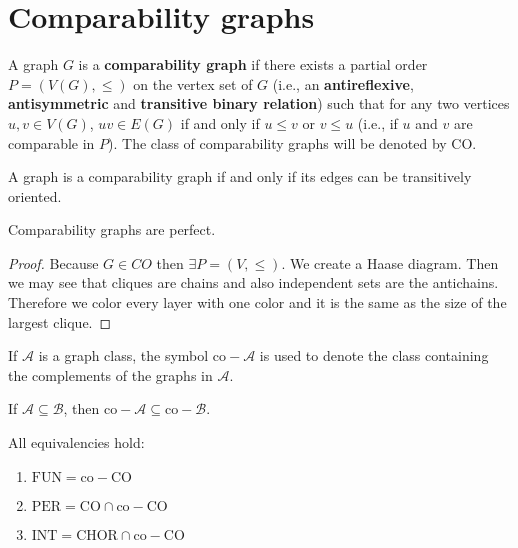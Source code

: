 \section{Comparability graphs}

\begin{defn}
	A graph $G$ is a \textbf{comparability graph} if there exists a partial order $P = (V(G), \leq)$ on the vertex set of $G$ (i.e., an \textbf{antireflexive}, \textbf{antisymmetric} and \textbf{transitive binary relation}) such that for any two vertices $u, v \in V(G)$, $uv \in E(G)$ if and only if $u \leq v$ or $v \leq u$ (i.e., if $u$ and $v$ are comparable in $P$). The class of comparability graphs will be denoted by CO.
\end{defn}

\begin{observ}
	A graph is a comparability graph if and only if its edges can be transitively oriented.
\end{observ}

\begin{thm}
	Comparability graphs are perfect.
\end{thm}

\begin{proof}
	Because $G \in CO$ then $\exists P = (V, \leq)$. We create a Haase diagram. Then we may see that cliques are chains and also independent sets are the antichains. Therefore we color every layer with one color and it is the same as the size of the largest clique.
\end{proof}

\begin{notation}
	If $\mathcal{A}$ is a graph class, the symbol $\text{co}-\mathcal{A}$ is used to denote the class containing the complements of the graphs in $\mathcal{A}$.
\end{notation}

\begin{observ}
	If $\mathcal{A} \subseteq \mathcal{B}$, then $\text{co}-\mathcal{A} \subseteq \text{co}-\mathcal{B}$.
\end{observ}

\begin{thm}
	All equivalencies hold:
	
	\begin{enumerate}
		\item $\text{FUN} = \text{co}-\text{CO}$
		\item $\text{PER} = \text{CO} \cap \text{co}-\text{CO}$
		\item $\text{INT} = \text{CHOR} \cap \text{co}-\text{CO}$
	\end{enumerate}
\end{thm}

